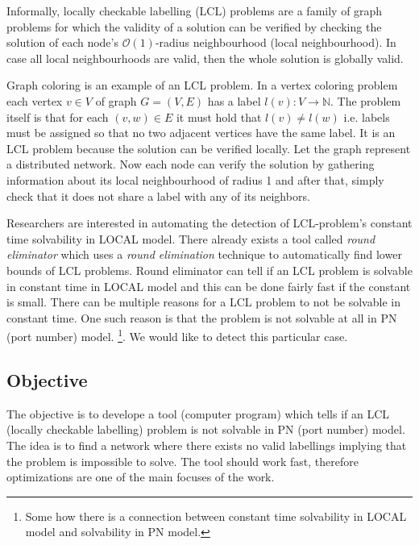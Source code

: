 Informally, locally checkable labelling (LCL) problems are a family of graph problems for which the validity of a solution can be verified by checking the solution of each node's $\mathcal{O}(1)$-radius neighbourhood (local neighbourhood).
In case all local neighbourhoods are valid, then the whole solution is globally valid.
\cite{DBLP:conf/podc/BrandtHKLOPRSU17}

Graph coloring is an example of an LCL problem.
In a vertex coloring problem each vertex $v \in V$ of graph $G = (V, E)$ has a label $l(v): V \rightarrow \mathbb{N}$.
The problem itself is that for each $(v, w) \in E$ it must hold that $l(v) \neq l(w)$ i.e. labels must be assigned so that no two adjacent vertices have the same label.
It is an LCL problem because the solution can be verified locally.
Let the graph represent a distributed network.
Now each node can verify the solution by gathering information about its local neighbourhood of radius 1 and after that, simply check that it does not share a label with any of its neighbors.

Researchers are interested in automating the detection of LCL-problem's constant time solvability in LOCAL model.
There already exists a tool called \emph{round eliminator} \cite{DBLP:conf/podc/Olivetti20} which uses a \emph{round elimination} \cite{DBLP:conf/podc/Brandt19} technique to automatically find lower bounds of LCL problems.
Round eliminator can tell if an LCL problem is solvable in constant time in LOCAL model and this can be done fairly fast if the constant is small.%
There can be multiple reasons for a LCL problem to not be solvable in constant time.
One such reason is that the problem is not solvable at all in PN (port number) model.
\footnote{Some how there is a connection between constant time solvability in LOCAL model and solvability in PN model.}.
We would like to detect this particular case.


\subsection*{Objective} %
The objective is to develope a tool (computer program) which tells if an LCL (locally checkable labelling) problem is not solvable in PN (port number) model.
The idea is to find a network where there exists no valid labellings implying that the problem is impossible to solve.
The tool should work fast, therefore optimizations are one of the main focuses of the work.

